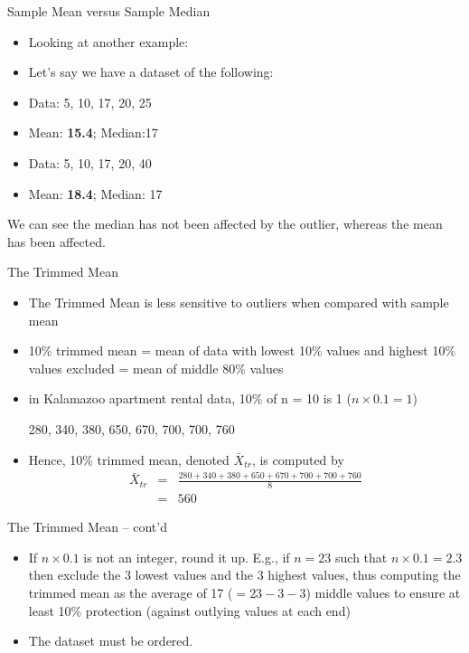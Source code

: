 \documentclass[14pt]{beamer}\usepackage[]{graphicx}\usepackage[]{color}
\begin{document}
\begin{frame}[fragile]{Sample Mean versus Sample Median}

\begin{itemize}
\item Looking at another example:
\item Let's say we have a dataset of the following:  
\item Data: 5, 10, 17, 20, 25
\item Mean: \textbf{15.4}; Median:17
\item Data: 5, 10, 17, 20, 40
\item Mean: \textbf{18.4};  Median: 17
\end{itemize}

We can see the median has not been affected by the outlier, whereas the  mean has been affected.

\end{frame}

\begin{frame}[fragile]{The Trimmed Mean}


{\small{
\begin{itemize}
\item<1-> The Trimmed Mean is less sensitive to outliers when compared with sample mean  
\item<2-> 10\% trimmed mean = mean of data with lowest 10\% values and  highest 10\% values excluded = mean of middle 80\% values
\item<3-> in Kalamazoo apartment rental data, 10\% of n = 10 is 1 ($n \times 0.1 = 1$)

280, 340, 380, 650, 670, 700, 700, 760
\item<4-> Hence, 10\% trimmed mean, denoted $\bar{X}_{tr}$, is computed by
\begin{eqnarray*}
\bar{X}_{tr} &=& \frac{280+340+380+650+670+700+700+760}{8} \\
     &=&560
\end{eqnarray*}
\end{itemize}
}}
\end{frame}

\begin{frame}[fragile]{The Trimmed Mean -- cont'd}

\begin{itemize}
\item<1-> If $n \times 0.1$ is not an integer, round it up. E.g., if $n = 23$ such that  $n \times 0.1 = 2.3$ then exclude the 3 lowest values and the 3 highest values, thus computing the trimmed mean as the  average of 17 ($= 23 - 3 - 3$) middle values to ensure at least  10\% protection (against outlying values at each end)

\item<2-> The dataset must be ordered.
\end{itemize}

\end{frame}
\end{document}
